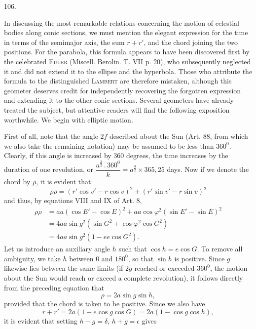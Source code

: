 \par{}\medskip
\hypertarget{native-146-article106}{}
\begin{center}106.\end{center}
In discussing the most remarkable relations concerning the motion of celestial bodies along conic sections, we must mention the elegant expression for the time in terms of the semimajor axis, the sum $r+r'$, and the chord joining the two positions. For the parabola, this formula appears to have been discovered first by the celebrated \textsc{Euler} (Miscell. Berolin. T. VII p. 20), who subsequently neglected it and did not extend it to the ellipse and the hyperbola. Those who attribute the formula to the distinguished \textsc{Lambert} are therefore mistaken, although this geometer deserves credit for independently recovering the forgotten expression and extending it to the other conic sections. Several geometers have already treated the subject, but attentive readers will find the following exposition worthwhile. We begin with elliptic motion.
\par
First of all, note that the angle $2f$ described about the Sun (Art. 88, from which we also take the remaining notation) may be assumed to be less than $360^0$. Clearly, if this angle is increased by 360 degrees, the time increases by the duration of one revolution, or $\dfrac{a^{\frac32}\mathpunct{.}360^0}{k}=a^{\frac32}\times365{,}25$ days. Now if we denote the chord by $\rho$, it is evident that
\[
\rho\rho=(r'\cos v'-r\cos v)^2+(r'\sin v'-r\sin v)^2
\]
\noindent and thus, by equations VIII and IX of Art. 8,
\[
\begin{aligned}
\rho\rho&=aa(\cos E'-\cos E)^2+aa\cos\varphi^2(\sin E'-\sin E)^2\\[.6em]
&=4aa\sin g^2(\sin G^2+\cos\varphi^2\cos G^2)\\[.6em]
&=4aa\sin g^2(1-ee\cos G^2).
\end{aligned}
\]
\noindent Let us introduce an auxiliary angle $h$ such that $\cos h=e\cos G$. To remove all ambiguity, we take $h$ between 0 and $180^0$, so that $\sin h$ is positive. Since $g$ likewise lies between the same limits (if $2g$ reached or exceeded $360^0$, the motion about the Sun would reach or exceed a complete revolution), it follows directly from the preceding equation that
\[
\rho=2a\sin g\sin h,
\]
\noindent provided that the chord is taken to be positive. Since we also have
\[
r+r'=2a(1-e\cos g\cos G)=2a(1-\cos g\cos h),
\]
\noindent it is evident that setting $h-g=\delta$, $h+g=\epsilon$ gives
